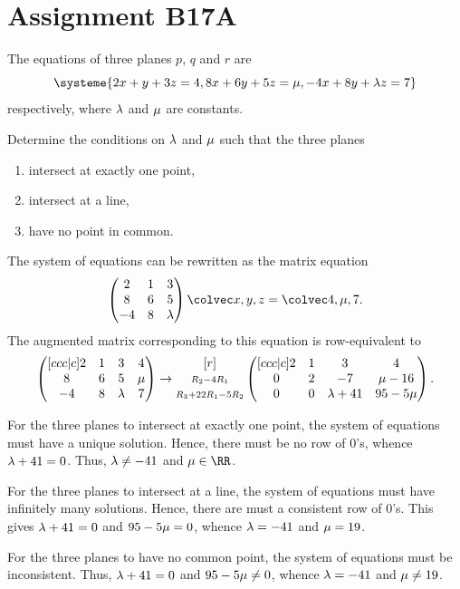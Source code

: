 \section{Assignment B17A}

\begin{problem}
    The equations of three planes $p$, $q$ and $r$ are \[\systeme{2x + y + 3z = 4, 8x + 6y + 5z = \m, -4x + 8y + \l z = 7}\] respectively, where $\lambda$ and $\mu$ are constants.

    Determine the conditions on $\lambda$ and $\mu$ such that the three planes
    \begin{enumerate}
        \item intersect at exactly one point,
        \item intersect at a line,
        \item have no point in common.
    \end{enumerate}
\end{problem}
\begin{solution}
    The system of equations can be rewritten as the matrix equation \[\begin{pmatrix}2 & 1 & 3 \\ 8 & 6 & 5 \\ -4 & 8 & \l\end{pmatrix} \cveciii{x}{y}{z} = \cveciii{4}{\m}{7}.\] The augmented matrix corresponding to this equation is row-equivalent to \[\begin{pmatrix}[ccc|c]2 & 1 & 3 & 4 \\ 8 & 6 & 5 & \mu \\ -4 & 8 & \lambda & 7\end{pmatrix} \rightarrow \begin{matrix}[r] \\ \scriptstyle R_2 - 4R_1 \\ \scriptstyle R_3 + 22R_1 - 5R_2\end{matrix} \begin{pmatrix}[ccc|c] 2 & 1 & 3 & 4 \\ 0 & 2 & -7 & \mu - 16 \\ 0 & 0 & \lambda + 41 & 95 - 5 \mu\end{pmatrix}.\]

    \begin{ppart}
        For the three planes to intersect at exactly one point, the system of equations must have a unique solution. Hence, there must be no row of 0's, whence $\lambda + 41 = 0$. Thus, $\lambda \neq -41$ and $\m \in \RR$.
    \end{ppart}
    \begin{ppart}
        For the three planes to intersect at a line, the system of equations must have infinitely many solutions. Hence, there are must a consistent row of 0's. This gives $\lambda + 41 = 0$ and $95 - 5\mu = 0$, whence $\lambda = -41$ and $\mu = 19$.
    \end{ppart}
    \begin{ppart}
        For the three planes to have no common point, the system of equations must be inconsistent. Thus, $\lambda + 41 = 0$ and $95 - 5\mu \neq 0$, whence $\lambda = -41$ and $\mu \neq 19$.
    \end{ppart}
\end{solution}

